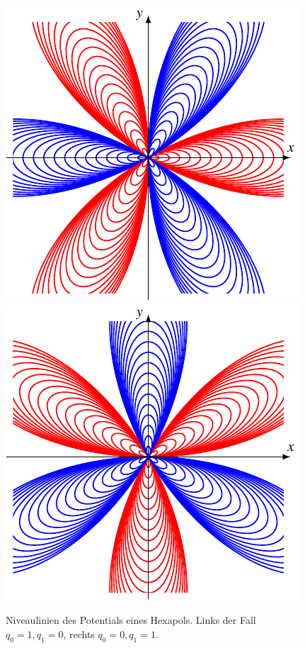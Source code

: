 \begin{figure}
\includegraphics{chapters/tikz/hexapol.pdf}
\includegraphics{chapters/tikz/hexapol1.pdf}
\caption{Niveaulinien des Potentials eines Hexapols.
Links der Fall $q_0=1,q_1=0$, rechts $q_0=0,q_1=1$.
\label{chapter:multipol:hexapolniveaux}}
\end{figure}
%

